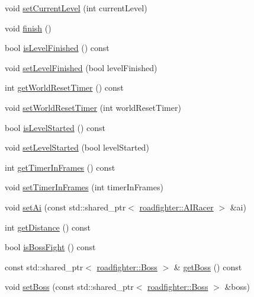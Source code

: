 \begin{DoxyCompactItemize}
\item 
void \hyperlink{classroadfighter_1_1World_adeace1fdc242cdaa44fb24e21e9b096b}{set\+Current\+Level} (int current\+Level)
\item 
void \hyperlink{classroadfighter_1_1World_af98f2facb11b701737df27b70b4b242a}{finish} ()
\item 
bool \hyperlink{classroadfighter_1_1World_a065d1588b466de04ec744d7872134d54}{is\+Level\+Finished} () const
\item 
void \hyperlink{classroadfighter_1_1World_a9ea901a6a9dc45e7d757c15e0e6368c0}{set\+Level\+Finished} (bool level\+Finished)
\item 
int \hyperlink{classroadfighter_1_1World_a5ddc1887b0773cb74d533cb7232282e9}{get\+World\+Reset\+Timer} () const
\item 
void \hyperlink{classroadfighter_1_1World_a1fb8a5fd2a407814e18b2f95b3fd430f}{set\+World\+Reset\+Timer} (int world\+Reset\+Timer)
\item 
bool \hyperlink{classroadfighter_1_1World_ad166a9c13a6d17efbee871cc3f309885}{is\+Level\+Started} () const
\item 
void \hyperlink{classroadfighter_1_1World_af45ecafe1e5ee7cd2262922f2b4926d7}{set\+Level\+Started} (bool level\+Started)
\item 
int \hyperlink{classroadfighter_1_1World_a13b25cd325f06cc775e5ddcf9945e5ed}{get\+Timer\+In\+Frames} () const
\item 
void \hyperlink{classroadfighter_1_1World_a4a411b997761a8527dffd6f6462abae1}{set\+Timer\+In\+Frames} (int timer\+In\+Frames)
\item 
void \hyperlink{classroadfighter_1_1World_a9df6024728886fede74affdd3e94cf71}{set\+Ai} (const std\+::shared\+\_\+ptr$<$ \hyperlink{classroadfighter_1_1AIRacer}{roadfighter\+::\+A\+I\+Racer} $>$ \&ai)
\item 
int \hyperlink{classroadfighter_1_1World_a0c19b2241b1846733cdd56d3a3e06824}{get\+Distance} () const
\item 
bool \hyperlink{classroadfighter_1_1World_aa4d900f9eb7bd623915087d1205308e7}{is\+Boss\+Fight} () const
\item 
const std\+::shared\+\_\+ptr$<$ \hyperlink{classroadfighter_1_1Boss}{roadfighter\+::\+Boss} $>$ \& \hyperlink{classroadfighter_1_1World_ac90d75fc462dcc7b966d7d13fd18b9cf}{get\+Boss} () const
\item 
void \hyperlink{classroadfighter_1_1World_a401b2f450e416827837d2f91da812381}{set\+Boss} (const std\+::shared\+\_\+ptr$<$ \hyperlink{classroadfighter_1_1Boss}{roadfighter\+::\+Boss} $>$ \&boss)

\end{DoxyCompactItemize}
